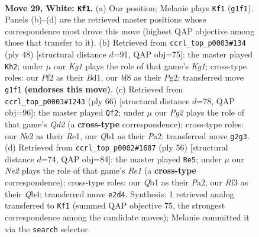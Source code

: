\documentclass[11pt]{article}
\begin{document}
\clearpage

\begin{figure}[p]\centering
\begin{subfigure}{0.46\textwidth}\centering
\resizebox{\linewidth}{!}{%
\newchessgame
\chessboard[
  setfen={1rq2b2/n3rk2/p2p1pp1/3P3p/Rp2P3/5R1P/3BNPP1/1Q4K1 w - - 0 29},
  showmover=false,
  pgfstyle=straightmove, color=movearrow, markmove={g1-f1}
]}
\caption{}
\end{subfigure}\hfill
\begin{subfigure}{0.46\textwidth}\centering
\resizebox{\linewidth}{!}{%
\newchessgame
\chessboard[
  setfen={1q3rk1/5pp1/p2p4/1bpP2p1/3nP3/P2P2QP/3N2P1/3B1RK1 w - - 2 25},
  showmover=false,
  pgfstyle=straightmove, color=movearrow, markmove={g1-h2}
]}
\caption{}
\end{subfigure}
\\[4pt]
\begin{subfigure}{0.46\textwidth}\centering
\resizebox{\linewidth}{!}{%
\newchessgame
\chessboard[
  setfen={2r2nk1/3qrp2/bp3Rp1/3pP3/p2N2P1/1P5P/P2Q2B1/4R1K1 w - - 0 34},
  showmover=false,
  pgfstyle=straightmove, color=movearrow, markmove={d2-f2}
]}
\caption{}
\end{subfigure}\hfill
\begin{subfigure}{0.46\textwidth}\centering
\resizebox{\linewidth}{!}{%
\newchessgame
\chessboard[
  setfen={1k1r3r/ppq5/2b1P3/5ppp/1Q1P4/2PB2PR/P2K4/4R3 w - - 1 29},
  showmover=false,
  pgfstyle=straightmove, color=movearrow, markmove={e1-e5}
]}
\caption{}
\end{subfigure}
\caption{\textbf{Move 29, White: \texttt{Kf1}.} (a) Our position; Melanie plays \texttt{Kf1} (\texttt{g1f1}). Panels (b)--(d) are the retrieved master positions whose correspondence most drove this move (highest QAP objective among those that transfer to it). (b) Retrieved from \texttt{ccrl\_top\_p0003\#134} (ply 48) [structural distance $d$=91, QAP obj=75]: the master played \texttt{Kh2}; under $\mu$ our \emph{Kg1} plays the role of that game's \emph{Kg1}; cross-type roles: our \emph{P}f2 as their \emph{B}d1, our \emph{b}f8 as their \emph{P}g2; transferred move \texttt{g1f1} \textbf{(endorses this move)}. (c) Retrieved from \texttt{ccrl\_top\_p0003\#1243} (ply 66) [structural distance $d$=78, QAP obj=96]: the master played \texttt{Qf2}; under $\mu$ our \emph{Pg2} plays the role of that game's \emph{Qd2} (a \textbf{cross-type} correspondence); cross-type roles: our \emph{N}e2 as their \emph{R}e1, our \emph{Q}b1 as their \emph{P}a2; transferred move \texttt{g2g3}. (d) Retrieved from \texttt{ccrl\_top\_p0002\#1687} (ply 56) [structural distance $d$=74, QAP obj=84]: the master played \texttt{Re5}; under $\mu$ our \emph{Ne2} plays the role of that game's \emph{Re1} (a \textbf{cross-type} correspondence); cross-type roles: our \emph{Q}b1 as their \emph{P}a2, our \emph{R}f3 as their \emph{Q}b4; transferred move \texttt{e2d4}. Synthesis: 1 retrieved analog transferred to \texttt{Kf1} (summed QAP objective 75, the strongest correspondence among the candidate moves); Melanie committed it via the \texttt{search} selector.}
\label{fig:thought-m56}
\end{figure}
\end{document}

